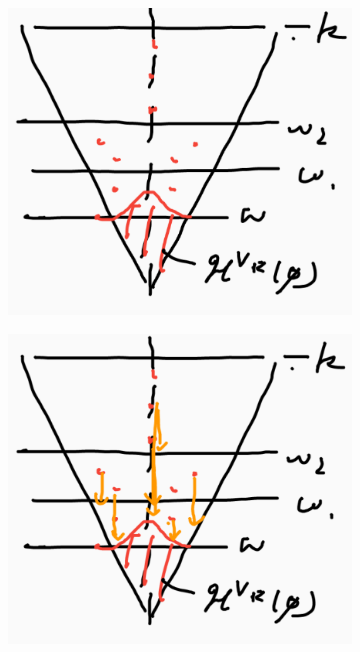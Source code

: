 \documentclass[12pt,a4paper]{article}
\begin{document}
\begin{figure}[h]
\begin{center}
    \begin{subfigure}[b]{0.3\textwidth}
        \includegraphics[scale=0.16]{4}
    \end{subfigure}
    \begin{subfigure}[b]{0.3\textwidth}
        \includegraphics[scale=0.16]{5}

\end{subfigure}
\end{center}
\end{figure}
\end{document}
